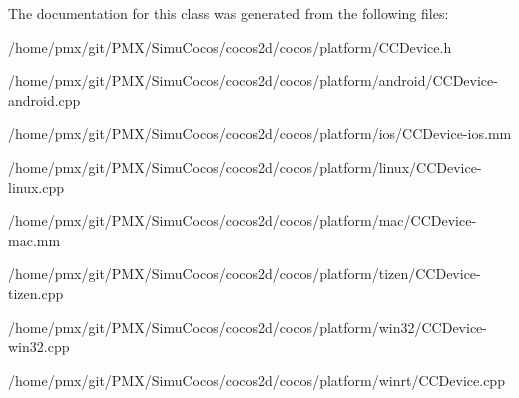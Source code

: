 The documentation for this class was generated from the following files\+:\begin{DoxyCompactItemize}
\item 
/home/pmx/git/\+P\+M\+X/\+Simu\+Cocos/cocos2d/cocos/platform/C\+C\+Device.\+h\item 
/home/pmx/git/\+P\+M\+X/\+Simu\+Cocos/cocos2d/cocos/platform/android/C\+C\+Device-\/android.\+cpp\item 
/home/pmx/git/\+P\+M\+X/\+Simu\+Cocos/cocos2d/cocos/platform/ios/C\+C\+Device-\/ios.\+mm\item 
/home/pmx/git/\+P\+M\+X/\+Simu\+Cocos/cocos2d/cocos/platform/linux/C\+C\+Device-\/linux.\+cpp\item 
/home/pmx/git/\+P\+M\+X/\+Simu\+Cocos/cocos2d/cocos/platform/mac/C\+C\+Device-\/mac.\+mm\item 
/home/pmx/git/\+P\+M\+X/\+Simu\+Cocos/cocos2d/cocos/platform/tizen/C\+C\+Device-\/tizen.\+cpp\item 
/home/pmx/git/\+P\+M\+X/\+Simu\+Cocos/cocos2d/cocos/platform/win32/C\+C\+Device-\/win32.\+cpp\item 
/home/pmx/git/\+P\+M\+X/\+Simu\+Cocos/cocos2d/cocos/platform/winrt/C\+C\+Device.\+cpp\end{DoxyCompactItemize}

